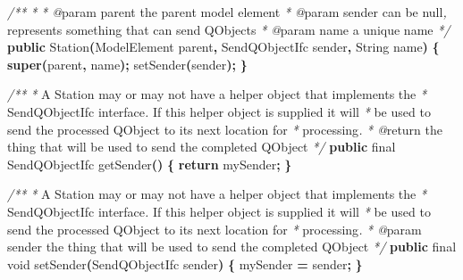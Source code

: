 \documentclass[
]{book}
\newenvironment{Shaded}{\begin{snugshade}}{\end{snugshade}}
\newcommand{\BuiltInTok}[1]{#1}
\newcommand{\CommentTok}[1]{\textcolor[rgb]{0.56,0.35,0.01}{\textit{#1}}}
\newcommand{\ControlFlowTok}[1]{\textcolor[rgb]{0.13,0.29,0.53}{\textbf{#1}}}
\newcommand{\DataTypeTok}[1]{\textcolor[rgb]{0.13,0.29,0.53}{#1}}
\newcommand{\FunctionTok}[1]{\textcolor[rgb]{0.00,0.00,0.00}{#1}}
\newcommand{\KeywordTok}[1]{\textcolor[rgb]{0.13,0.29,0.53}{\textbf{#1}}}
\newcommand{\NormalTok}[1]{#1}
\newcommand{\OperatorTok}[1]{\textcolor[rgb]{0.81,0.36,0.00}{\textbf{#1}}}
\theoremstyle{definition}
\theoremstyle{definition}
\theoremstyle{definition}
\theoremstyle{definition}
\theoremstyle{remark}
\begin{document}
\begin{Shaded}
\begin{Highlighting}[]
    \CommentTok{/**}
     \CommentTok{*} 
\CommentTok{     * @}\NormalTok{param parent the parent model element}
     \CommentTok{*} \CommentTok{@}\NormalTok{param sender can be null}\CommentTok{,}\NormalTok{ represents something that can send QObjects}
     \CommentTok{*} \CommentTok{@}\NormalTok{param name a unique name}
     \CommentTok{*/}
    \KeywordTok{public} \FunctionTok{Station}\OperatorTok{(}\NormalTok{ModelElement parent}\OperatorTok{,}\NormalTok{ SendQObjectIfc sender}\OperatorTok{,} \BuiltInTok{String}\NormalTok{ name}\OperatorTok{)} \OperatorTok{\{}
        \KeywordTok{super}\OperatorTok{(}\NormalTok{parent}\OperatorTok{,}\NormalTok{ name}\OperatorTok{);}
        \FunctionTok{setSender}\OperatorTok{(}\NormalTok{sender}\OperatorTok{);}
    \OperatorTok{\}}

    \CommentTok{/**}
     \CommentTok{*}\NormalTok{ A Station may or may not have a helper object that implements the }
     \CommentTok{*}\NormalTok{  SendQObjectIfc interface}\CommentTok{. }\NormalTok{ If this helper object is supplied it will}
     \CommentTok{*}\NormalTok{  be used to send the processed QObject to its next location for}
     \CommentTok{*}\NormalTok{  processing}\CommentTok{.}
     \CommentTok{*} \CommentTok{@}\NormalTok{return the thing that will be used to send the completed QObject}
     \CommentTok{*/}
    \KeywordTok{public} \DataTypeTok{final}\NormalTok{ SendQObjectIfc }\FunctionTok{getSender}\OperatorTok{()} \OperatorTok{\{}
        \ControlFlowTok{return}\NormalTok{ mySender}\OperatorTok{;}
    \OperatorTok{\}}

    \CommentTok{/**}
     \CommentTok{*}\NormalTok{ A Station may or may not have a helper object that implements the }
     \CommentTok{*}\NormalTok{  SendQObjectIfc interface}\CommentTok{. }\NormalTok{ If this helper object is supplied it will}
     \CommentTok{*}\NormalTok{  be used to send the processed QObject to its next location for}
     \CommentTok{*}\NormalTok{  processing}\CommentTok{.}
     \CommentTok{*} \CommentTok{@}\NormalTok{param sender the thing that will be used to send the completed QObject}
     \CommentTok{*/}
    \KeywordTok{public} \DataTypeTok{final} \DataTypeTok{void} \FunctionTok{setSender}\OperatorTok{(}\NormalTok{SendQObjectIfc sender}\OperatorTok{)} \OperatorTok{\{}
\NormalTok{        mySender }\OperatorTok{=}\NormalTok{ sender}\OperatorTok{;}
    \OperatorTok{\}}


\end{Highlighting}
\end{Shaded}
\end{document}

